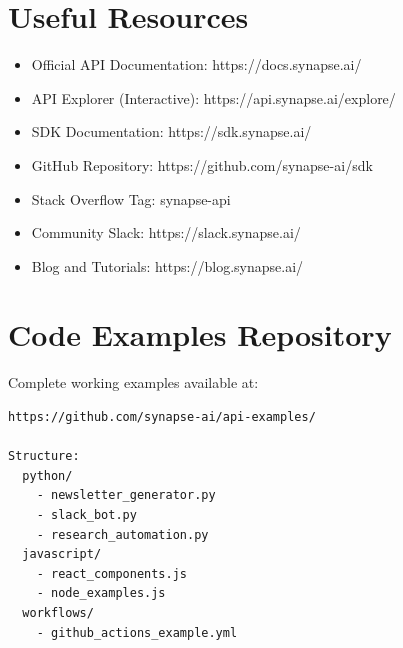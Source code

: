 \documentclass{report}
\begin{document}
\section{Useful Resources}

\begin{itemize}
    \item Official API Documentation: https://docs.synapse.ai/
    \item API Explorer (Interactive): https://api.synapse.ai/explore/
    \item SDK Documentation: https://sdk.synapse.ai/
    \item GitHub Repository: https://github.com/synapse-ai/sdk
    \item Stack Overflow Tag: synapse-api
    \item Community Slack: https://slack.synapse.ai/
    \item Blog and Tutorials: https://blog.synapse.ai/
\end{itemize}

\section{Code Examples Repository}

Complete working examples available at:

\begin{lstlisting}[language=bash]
https://github.com/synapse-ai/api-examples/

Structure:
  python/
    - newsletter_generator.py
    - slack_bot.py
    - research_automation.py
  javascript/
    - react_components.js
    - node_examples.js
  workflows/
    - github_actions_example.yml
\end{lstlisting}
\end{document}
